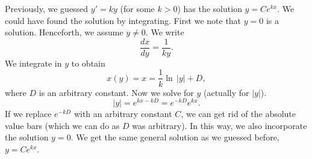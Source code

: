 \begin{example}
Previously, we guessed $y' = ky$ (for some $k > 0$) has the solution
$y=Ce^{kx}$.  We could have found the solution by integrating.
First we note that $y=0$ is a solution.
Henceforth, we assume $y \neq 0$.  We write
\begin{equation*}
\frac{dx}{dy} = \frac{1}{ky} .
\end{equation*}
We integrate in $y$ to obtain
\begin{equation*}
x(y) = x = \frac{1}{k} \ln \, \lvert y \rvert + D,
\end{equation*}
where $D$ is an arbitrary constant.
Now we solve for $y$ (actually for $\lvert y \rvert$).
\begin{equation*}
\lvert y \rvert =
e^{kx-kD} =
e^{-kD} e^{k x} .
\end{equation*}
If we replace $e^{-kD}$ with an arbitrary constant $C$, we can
get rid of the absolute value bars (which we can do as $D$ was arbitrary).  In
this way, we
also incorporate the solution $y=0$.  We get the same general solution as
we guessed before, $y = Ce^{kx}$.
\end{example}

